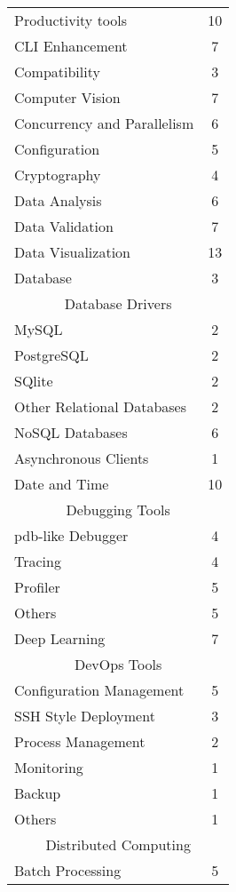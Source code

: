 \begin{longtable} {|l|c|}
    \hline
    \newpage
    \multicolumn{2}{|c|}{Command Line Tools}\\
    \hline
    Productivity tools & 10\\
    CLI Enhancement & 7\\
    \hline
    Compatibility & 3\\
    \hline
    Computer Vision & 7\\
    \hline
    Concurrency and Parallelism & 6\\
    \hline
    Configuration & 5\\
    \hline
    Cryptography & 4\\
    \hline
    Data Analysis & 6\\
    \hline
    Data Validation & 7\\
    \hline
    Data Visualization & 13\\
    \hline
    Database & 3\\
    \hline
    \multicolumn{2}{|c|}{Database Drivers}\\
    \hline
    MySQL & 2\\
    PostgreSQL  & 2\\
    SQlite & 2\\
    Other Relational Databases & 2\\
    NoSQL Databases & 6\\
    Asynchronous Clients & 1\\
    \hline
    Date and Time & 10\\
    \hline
    \multicolumn{2}{|c|}{Debugging Tools}\\
    \hline
    pdb-like Debugger & 4\\
    Tracing & 4\\
    Profiler & 5\\
    Others & 5\\
    \hline
    Deep Learning & 7\\
    \hline
    \multicolumn{2}{|c|}{DevOps Tools}\\
    \hline
    Configuration Management & 5\\
    SSH Style Deployment & 3\\
    Process Management & 2\\
    Monitoring & 1\\
    Backup & 1\\
    Others & 1\\
    \hline
    \multicolumn{2}{|c|}{Distributed Computing}\\
    \hline
    Batch Processing & 5\\

\end{longtable}
